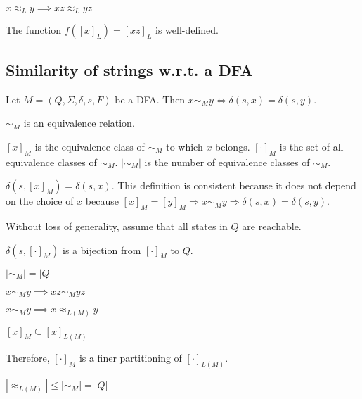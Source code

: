\begin{theorem}$x \approx_L y \implies xz \approx_L yz$\end{theorem}
\begin{corollary}\label{append-equiv-well-defined}
The function $f([x]_L) = [xz]_L$ is well-defined.
\end{corollary}

\subsection{Similarity of strings w.r.t. a DFA}

\begin{definition}
Let $M = (Q, \Sigma, \delta, s, F)$ be a DFA.
Then $x \sim_M y \iff \delta(s, x) = \delta(s, y)$.
\end{definition}

\begin{theorem} $\sim_M$ is an equivalence relation. \end{theorem}
\begin{definition}
$[x]_M$ is the equivalence class of $\sim_M$ to which $x$ belongs.
$[\cdot]_M$ is the set of all equivalence classes of $\sim_M$.
$|\sim_M|$ is the number of equivalence classes of $\sim_M$.
\end{definition}
\begin{definition} $\delta(s, [x]_M) = \delta(s, x)$.
This definition is consistent because it does not depend on the choice of $x$
because $[x]_M = [y]_M \Rightarrow x \sim_M y \Rightarrow \delta(s, x) = \delta(s, y)$.
\end{definition}
Without loss of generality, assume that all states in $Q$ are reachable.
\begin{theorem} $\delta(s, [\cdot]_M)$ is a bijection from $[\cdot]_M$ to $Q$. \end{theorem}
\begin{corollary} $|\sim_M| = |Q|$ \end{corollary}

\begin{theorem} $x \sim_M y \implies xz \sim_M yz$ \end{theorem}
\begin{theorem} $x \sim_M y \implies x \approx_{L(M)} y$ \end{theorem}
\begin{corollary} $[x]_M \subseteq [x]_{L(M)}$ \end{corollary}
Therefore, $[\cdot]_M$ is a finer partitioning of $[\cdot]_{L(M)}$.
\begin{corollary} $|\approx_{L(M)}| \le |\sim_M| = |Q|$ \end{corollary}


